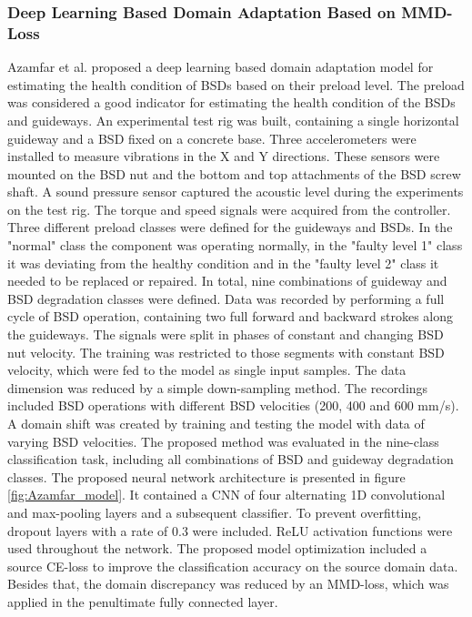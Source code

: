 \subsubsection{Deep Learning Based Domain Adaptation Based on MMD-Loss}
Azamfar et al. \cite{AZAMFAR2020103932} proposed a deep learning based domain adaptation model for estimating the health condition of BSDs based on their preload level. The preload was considered a good indicator for estimating the health condition of the BSDs and guideways. An experimental test rig was built, containing a single horizontal guideway and a BSD fixed on a concrete base. Three accelerometers were installed to measure vibrations in the X and Y directions. These sensors were mounted on the BSD nut and the bottom and top attachments of the BSD screw shaft. A sound pressure sensor captured the acoustic level during the experiments on the test rig. The torque and speed signals were acquired from the controller. Three different preload classes were defined for the guideways and BSDs. In the "normal" class the component was operating normally, in the "faulty level 1" class it was deviating from the healthy condition and in the "faulty level 2" class it needed to be replaced or repaired. In total, nine combinations of guideway and BSD degradation classes were defined. Data was recorded by performing a full cycle of BSD operation, containing two full forward and backward strokes along the guideways. The signals were split in phases of constant and changing BSD nut velocity. The training was restricted to those segments with constant BSD velocity, which were fed to the model as single input samples. The data dimension was reduced by a simple down-sampling method. The recordings included BSD operations with different BSD velocities (200, 400 and 600 mm/s). A domain shift was created by training and testing the model with data of varying BSD velocities. The proposed method was evaluated in the nine-class classification task, including all combinations of BSD and guideway degradation classes. The proposed neural network architecture is presented in figure \ref{fig:Azamfar_model}. It contained a CNN of four alternating 1D convolutional and max-pooling layers and a subsequent classifier. To prevent overfitting, dropout layers with a rate of 0.3 were included. ReLU activation functions were used throughout the network. The proposed model optimization included a source CE-loss to improve the classification accuracy on the source domain data. Besides that, the domain discrepancy was reduced by an MMD-loss, which was applied in the penultimate fully connected layer. 

